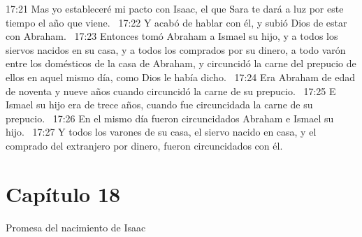 17:21 Mas yo estableceré mi pacto con Isaac, el que Sara te dará a luz por este tiempo el año que viene.  
17:22 Y acabó de hablar con él, y subió Dios de estar con Abraham.  
17:23 Entonces tomó Abraham a Ismael su hijo, y a todos los siervos nacidos en su casa, y a todos los comprados por su dinero, a todo varón entre los domésticos de la casa de Abraham, y circuncidó la carne del prepucio de ellos en aquel mismo día, como Dios le había dicho.  
17:24 Era Abraham de edad de noventa y nueve años cuando circuncidó la carne de su prepucio.  
17:25 E Ismael su hijo era de trece años, cuando fue circuncidada la carne de su prepucio.  
17:26 En el mismo día fueron circuncidados Abraham e Ismael su hijo.  
17:27 Y todos los varones de su casa, el siervo nacido en casa, y el comprado del extranjero por dinero, fueron circuncidados con él. 

\section*{Capítulo 18}
Promesa del nacimiento de Isaac  

